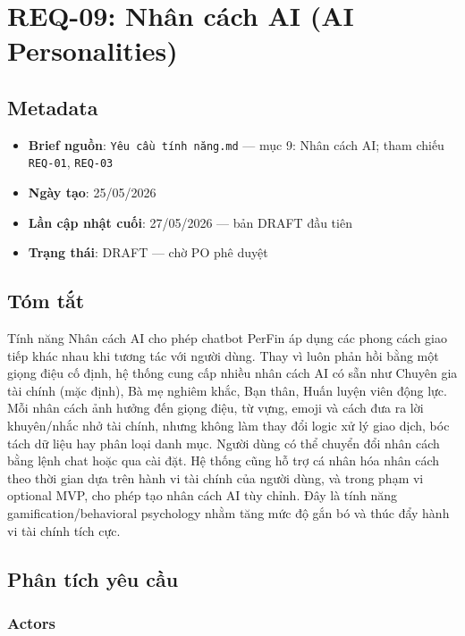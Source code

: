 \section{REQ-09: Nhân cách AI (AI Personalities)}



\subsection{Metadata}

\begin{itemize}
\item \textbf{Brief nguồn}: \texttt{Yêu cầu tính năng.md} — mục 9: Nhân cách AI; tham chiếu \texttt{REQ-01}, \texttt{REQ-03}
\item \textbf{Ngày tạo}: 25/05/2026
\item \textbf{Lần cập nhật cuối}: 27/05/2026 — bản DRAFT đầu tiên
\item \textbf{Trạng thái}: DRAFT — chờ PO phê duyệt
\end{itemize}
\subsection{Tóm tắt}

Tính năng Nhân cách AI cho phép chatbot PerFin áp dụng các phong cách giao tiếp khác nhau khi tương tác với người dùng. Thay vì luôn phản hồi bằng một giọng điệu cố định, hệ thống cung cấp nhiều nhân cách AI có sẵn như Chuyên gia tài chính (mặc định), Bà mẹ nghiêm khắc, Bạn thân, Huấn luyện viên động lực. Mỗi nhân cách ảnh hưởng đến giọng điệu, từ vựng, emoji và cách đưa ra lời khuyên/nhắc nhở tài chính, nhưng không làm thay đổi logic xử lý giao dịch, bóc tách dữ liệu hay phân loại danh mục. Người dùng có thể chuyển đổi nhân cách bằng lệnh chat hoặc qua cài đặt. Hệ thống cũng hỗ trợ cá nhân hóa nhân cách theo thời gian dựa trên hành vi tài chính của người dùng, và trong phạm vi optional MVP, cho phép tạo nhân cách AI tùy chỉnh. Đây là tính năng gamification/behavioral psychology nhằm tăng mức độ gắn bó và thúc đẩy hành vi tài chính tích cực.



\subsection{Phân tích yêu cầu}



\subsubsection{Actors}


